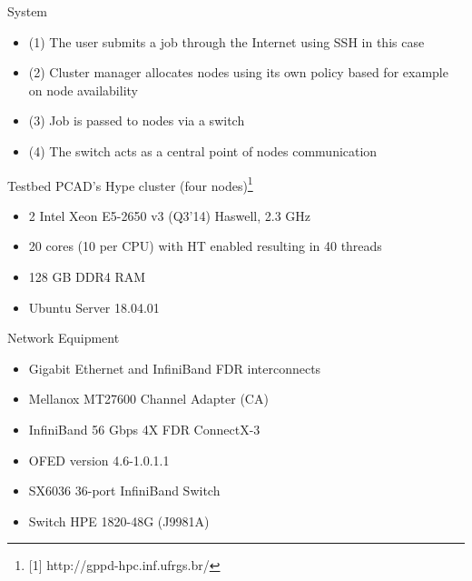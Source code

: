\documentclass{beamer}
\begin{document}
\begin{frame}{System}
\begin{center}
\end{center}    
    \begin{itemize}
    \item (1) The user submits a job through the Internet using SSH in this case
    \item (2) Cluster manager allocates nodes using its own policy based for example on node availability
    \item (3) Job is passed to nodes via a switch
    \item (4) The switch acts as a central point of nodes communication
    \end{itemize}
\end{frame}

\begin{frame}{Testbed}
PCAD's Hype cluster (four nodes)\footnote{[1] http://gppd-hpc.inf.ufrgs.br/}
\begin{itemize}
\item 2 \texttimes{} Intel Xeon E5-2650 v3 (Q3'14) Haswell, 2.3 GHz
\item 20 cores (10 per CPU) with HT enabled resulting in 40 threads
\item 128 GB DDR4 RAM
\item Ubuntu Server 18.04.01
\end{itemize}
Network Equipment
\begin{itemize}
\item Gigabit Ethernet and InfiniBand FDR interconnects
\item Mellanox MT27600 Channel Adapter (CA)
\item InfiniBand 56 Gbps 4X FDR ConnectX-3
\item OFED version 4.6-1.0.1.1
\item SX6036 36-port InfiniBand Switch
\item Switch HPE 1820-48G (J9981A)
\end{itemize}
\end{frame}
\end{document}
